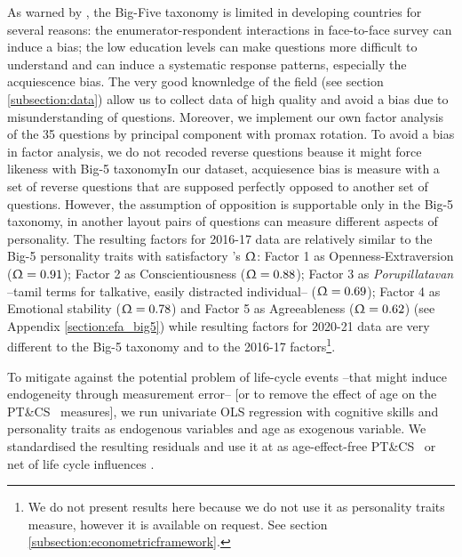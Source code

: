 \documentclass[a4paper, 11pt, onecolumn]{article}
\newcommand{\PTCS}{PT\&CS}
\begin{document}
As warned by \cite{Laajaj2019}, the Big-Five taxonomy is limited in developing countries for several reasons: the enumerator-respondent interactions in face-to-face survey can induce a bias; the low education levels can make questions more difficult to understand and can induce a systematic response patterns, especially the acquiescence bias.
The very good knownledge of the field (see section \ref{subsection:data}) allow us to collect data of high quality and avoid a bias due to misunderstanding of questions.
Moreover, we implement our own factor analysis of the 35 questions by principal component with promax rotation.
To avoid a bias in factor analysis, we do not recoded reverse questions beause it might force likeness with Big-5 taxonomyIn our dataset, acquiesence bias is measure with a set of reverse questions that are supposed perfectly opposed to another set of questions. 
However, the assumption of opposition is supportable only in the Big-5 taxonomy, in another layout pairs of questions can measure different aspects of personality.
The resulting factors for 2016-17 data are relatively similar to the Big-5 personality traits with satisfactory \citeauthor{McDonald1999}'s $\Upomega$: Factor 1 as Openness-Extraversion ($\Upomega=0.91$); Factor 2 as Conscientiousness ($\Upomega=0.88$); Factor 3 as \textit{Porupillatavan} --tamil terms for talkative, easily distracted individual-- ($\Upomega=0.69$); Factor 4 as Emotional stability ($\Upomega=0.78$) and Factor 5 as Agreeableness ($\Upomega=0.62$) (see Appendix \ref{section:efa_big5}) while resulting factors for 2020-21 data are very different to the Big-5 taxonomy and to the 2016-17 factors\footnote{We do not present results here because we do not use it as personality traits measure, however it is available on request. See section \ref{subsection:econometricframework}.}.

To mitigate against the potential problem of life-cycle events --that might induce endogeneity through measurement error-- [or to remove the effect of age on the \PTCS~ measures], we run univariate OLS regression with cognitive skills and personality traits as endogenous variables and age as exogenous variable. %
We standardised the resulting residuals and use it at as age-effect-free \PTCS~ or net of life cycle influences \citep{Nyhus2005, Brown2014, Groves2005}. 
\end{document}
